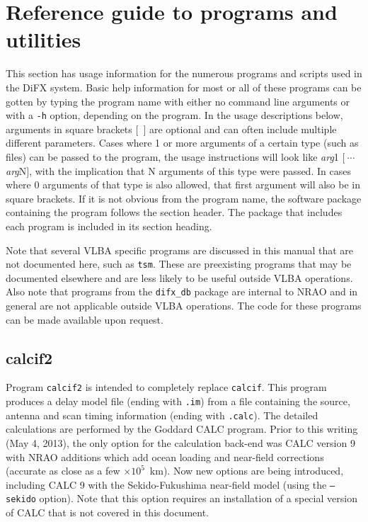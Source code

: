 \section{Reference guide to programs and utilities} \label{sec:programs}

This section has usage information for the numerous programs and scripts used in the DiFX system.
Basic help information for most or all of these programs can be gotten by typing the program name with either no command line arguments or with a {\tt -h} option, depending on the program.
In the usage descriptions below, arguments in square brackets $[$\ $]$ are optional and can often include multiple different parameters.
Cases where 1 or more arguments of a certain type (such as files) can be passed to the program, the usage instructions will look like {\em arg}1 $[\ \cdots$ {\em arg}N$]$, with the implication that N arguments of this type were passed.
In cases where 0 arguments of that type is also allowed, that first argument will also be in square brackets.
If it is not obvious from the program name, the software package containing the program follows the section header.
The package that includes each program is included in its section heading.

Note that several VLBA specific programs are discussed in this manual that are not documented here, such as {\tt tsm}.
These are preexisting programs that may be documented elsewhere and are less likely to be useful outside VLBA operations.
Also note that programs from the {\tt difx\_db} package are internal to NRAO and in general are not applicable outside VLBA operations.
The code for these programs can be made available upon request.








\subsection{calcif2} \label{sec:calcif2}

Program {\tt calcif2} is intended to completely replace {\tt calcif}.
This program produces a delay model file (ending with {\tt .im}) from a file containing the source, antenna and scan timing information (ending with {\tt .calc}).
The detailed calculations are performed by the Goddard CALC program.
Prior to this writing (May 4, 2013), the only option for the calculation back-end was CALC version 9 with NRAO additions which add ocean loading and near-field corrections (accurate as close as a few $\times 10^5$~km). 
Now new options are being introduced, including CALC 9 with the Sekido-Fukushima near-field model (using the {\tt --sekido} option).
Note that this option requires an installation of a special version of CALC that is not covered in this document.

